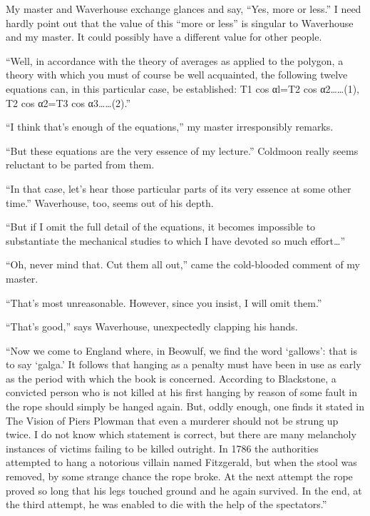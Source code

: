 \documentclass[12pt, openright]{book}
\begin{document}
My master and Waverhouse exchange glances and say, ``Yes, more or
less.'' I need hardly point out that the value of this ``more or less''
is singular to Waverhouse and my master. It could possibly have a
different value for other people.

``Well, in accordance with the theory of averages as applied to the
polygon, a theory with which you must of course be well acquainted, the
following twelve equations can, in this particular case, be established:
T1 cos αl=T2 cos α2\ldots{}\ldots{}(1), T2 cos α2=T3 cos
α3\ldots{}\ldots{}(2).''

``I think that's enough of the equations,'' my master irresponsibly
remarks.

``But these equations are the very essence of my lecture.'' Coldmoon
really seems reluctant to be parted from them.

``In that case, let's hear those particular parts of its very essence at
some other time.'' Waverhouse, too, seems out of his depth.

``But if I omit the full detail of the equations, it becomes impossible
to substantiate the mechanical studies to which I have devoted so much
effort\ldots{}''

``Oh, never mind that. Cut them all out,'' came the cold-blooded comment
of my master.

``That's most unreasonable. However, since you insist, I will omit
them.''

``That's good,'' says Waverhouse, unexpectedly clapping his hands.

``Now we come to England where, in Beowulf, we find the word `gallows':
that is to say `galga.' It follows that hanging as a penalty must have
been in use as early as the period with which the book is concerned.
According to Blackstone, a convicted person who is not killed at his
first hanging by reason of some fault in the rope should simply be
hanged again. But, oddly enough, one finds it stated in The Vision of
Piers Plowman that even a murderer should not be strung up twice. I do
not know which statement is correct, but there are many melancholy
instances of victims failing to be killed outright. In 1786 the
authorities attempted to hang a notorious villain named Fitzgerald, but
when the stool was removed, by some strange chance the rope broke. At
the next attempt the rope proved so long that his legs touched ground
and he again survived. In the end, at the third attempt, he was enabled
to die with the help of the spectators.''
\end{document}

